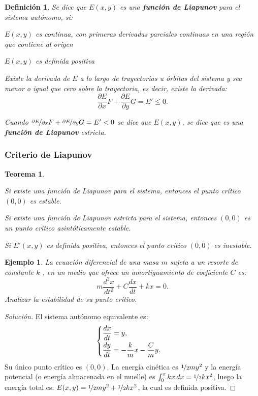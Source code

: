 \documentclass[a5paper,doc,10pt,noapacite]{apa6}
\newtheorem{definicion}{Definición}
\newtheorem{teorema}{Teorema}
\newtheorem{ejem}{Ejemplo}
\begin{document}
{{\begin{definicion}
	Se dice que \(E(x,y)\) es una \emph{\textbf{función de Liapunov}} para el sistema autónomo, si:
	\begin{APAitemize}
		\item \(E(x,y)\) es continua, con primeras derivadas parciales continuas en una región que contiene al 	origen
		\item \(E(x,y)\) es definida positiva
		\item Existe la derivada de \(E\) a lo largo de trayectorias u órbitas del sistema y sea menor o igual que cero sobre la trayectoria, es decir, existe la derivada:
		\[
		\dfrac{\partial E}{\partial x}F+\dfrac{\partial E}{\partial y}G=E'\leq 0.
		\]
		\item Cuando \(\nicefrac{\partial E}{\partial x}F+\nicefrac{\partial E}{\partial y}G=E'<0\) se dice que \(E(x,y)\), se dice que es una \emph{\textbf{función de Liapunov}}	estricta.
	\end{APAitemize}
\end{definicion}


\subsubsection{Criterio de Liapunov}

\begin{teorema}\quad
	\begin{APAenumerate}
		\item Si existe una función de Liapunov para el sistema, entonces el punto crítico \(( 0 , 0 )\) es estable.
		\item Si existe una función de Liapunov estricta para el sistema, entonces \((0,0)\) es un punto crítico asintóticamente estable.
		\item Si \(E'(x,y)\) es definida positiva, entonces el punto crítico \((0,0)\) es inestable.
	\end{APAenumerate}
\end{teorema}

\begin{ejem}
	La ecuación diferencial de una masa \(m\) sujeta a un resorte de constante \(k\) , en un medio que ofrece un amortiguamiento de coeficiente \(C\) es:
	\[
	m\dfrac{d^2x}{dt^2}+C\dfrac{dx}{dt}+kx=0.
	\]
	Analizar la estabilidad de su punto crítico.
\end{ejem}
\begin{proof}[Solución]
		El sistema autónomo equivalente es:
		\[
		\begin{cases}
		\dfrac{dx}{dt}=y,\vspace{0.3em}
		\\
		\dfrac{dy}{dt}=-\dfrac{k}{m}x-\dfrac{C}{m}y.
	\end{cases}
		\]
		Su único punto crítico es \((0,0)\). La energía cinética es \(\nicefrac{1}{2}my^2\) y la energía potencial (o energía almacenada en el muelle) es \(\int_{0}^{x}kx\,dx=\nicefrac{1}{2}kx^2\), luego la energía total es: \(E(x,y)=\nicefrac{1}{2}my^2+\nicefrac{1}{2}kx^2\), la cual es definida positiva.
		

\end{proof}}}
\end{document}
